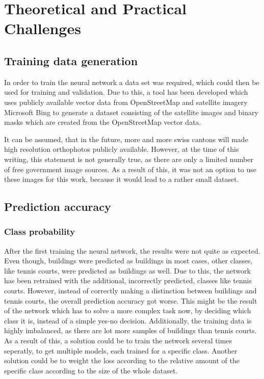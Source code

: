 
\chapter{Theoretical and Practical Challenges}

\section{Training data generation}
In order to train the neural network a data set was required, which could then be used for training and validation. Due to this, a tool \cite{airtiler} has been developed which uses publicly available vector data from OpenStreetMap and satellite imagery Microsoft Bing to generate a dataset consisting of the satellite images and binary masks which are created from the OpenStreetMap vector data.

It can be assumed, that in the future, more and more swiss cantons will made high resolution orthophotos publicly available. However, at the time of this writing, this statement is not generally true, as there are only a limited number of free government image sources. As a result of this, it was not an option to use these images for this work, because it would lead to a rather small dataset.

\section{Prediction accuracy}
\subsection{Class probability}
After the first training the neural network, the results were not quite as expected. Even though, buildings were predicted as buildings in most cases, other classes, like tennis courts, were predicted as buildings as well. Due to this, the network has been retrained with the additional, incorrectly predicted, classes like tennis courts. However, instead of correctly making a distinction between buildings and tennis courts, the overall prediction accuracy got worse. 
This might be the result of the network which has to solve a more complex task now, by deciding which class it is, instead of a simple yes-no decision. Additionally, the training data is highly imbalanced, as there are lot more samples of buildings than tennis courts.
As a result of this, a solution could be to train the network several times seperatly, to get multiple models, each trained for a specific class. Another solution could be to weight the loss according to the relative amount of the specific class according to the size of the whole dataset.

